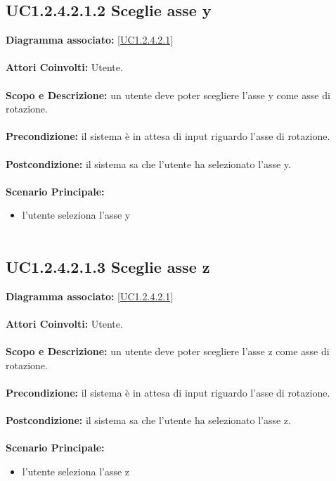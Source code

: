 \subsection{UC1.2.4.2.1.2 Sceglie asse y}
\textbf{Diagramma associato:}
\ref{UC1.2.4.2.1} \\ \\
\textbf{Attori Coinvolti:}
Utente. \\ \\
\textbf{Scopo e Descrizione:}
un utente deve poter scegliere l'asse y come asse di rotazione. \\ \\
\textbf{Precondizione:}
il sistema è in attesa di input riguardo l'asse di rotazione. \\ \\
\textbf{Postcondizione:}
il sistema sa che l'utente ha selezionato l'asse y. \\ \\
\textbf{Scenario Principale:}
\begin{itemize}
\item l'utente seleziona l'asse y
\\ \\ \end{itemize}


\subsection{UC1.2.4.2.1.3 Sceglie asse z}
\textbf{Diagramma associato:}
\ref{UC1.2.4.2.1} \\ \\
\textbf{Attori Coinvolti:}
Utente. \\ \\
\textbf{Scopo e Descrizione:}
un utente deve poter scegliere l'asse z come asse di rotazione. \\ \\
\textbf{Precondizione:}
il sistema è in attesa di input riguardo l'asse di rotazione. \\ \\
\textbf{Postcondizione:}
il sistema sa che l'utente ha selezionato l'asse z. \\ \\
\textbf{Scenario Principale:}
\begin{itemize}
\item l'utente seleziona l'asse z
\\ \\ \end{itemize}


